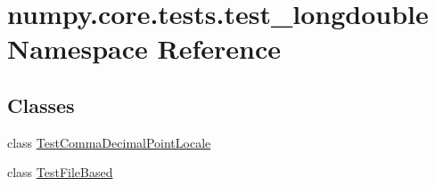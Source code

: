 \hypertarget{namespacenumpy_1_1core_1_1tests_1_1test__longdouble}{}\section{numpy.\+core.\+tests.\+test\+\_\+longdouble Namespace Reference}
\label{namespacenumpy_1_1core_1_1tests_1_1test__longdouble}
\subsection*{Classes}
\begin{DoxyCompactItemize}
\item 
class \hyperlink{classnumpy_1_1core_1_1tests_1_1test__longdouble_1_1TestCommaDecimalPointLocale}{Test\+Comma\+Decimal\+Point\+Locale}
\item 
class \hyperlink{classnumpy_1_1core_1_1tests_1_1test__longdouble_1_1TestFileBased}{Test\+File\+Based}
\end{DoxyCompactItemize}
